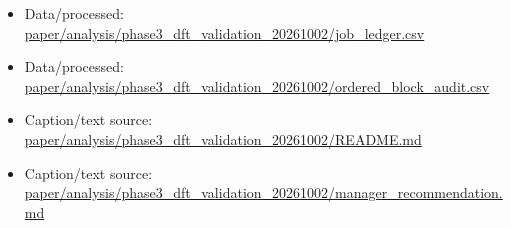 \begin{itemize}[leftmargin=1.4em,noitemsep]
\item Data/processed: \begingroup\scriptsize\url{paper/analysis/phase3_dft_validation_20261002/job_ledger.csv}\endgroup
\item Data/processed: \begingroup\scriptsize\url{paper/analysis/phase3_dft_validation_20261002/ordered_block_audit.csv}\endgroup
\item Caption/text source: \begingroup\scriptsize\url{paper/analysis/phase3_dft_validation_20261002/README.md}\endgroup
\item Caption/text source: \begingroup\scriptsize\url{paper/analysis/phase3_dft_validation_20261002/manager_recommendation.md}\endgroup
\end{itemize}
